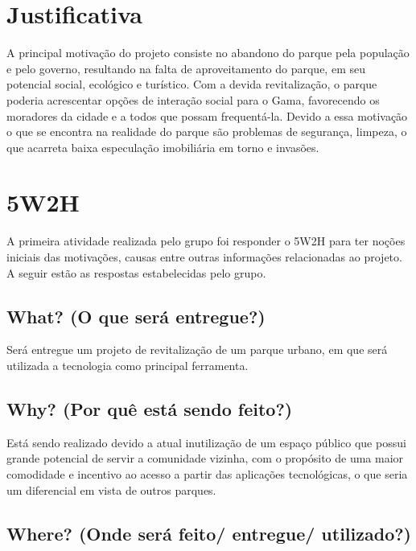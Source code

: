 \section{Justificativa}

A principal motiva\c{c}\~ao do projeto consiste no abandono do parque pela popula\c{c}\~ao e pelo governo, resultando na falta de aproveitamento do parque, em seu potencial social, ecológico e turístico. Com a devida revitaliza\c{c}\~ao, o parque poderia acrescentar op\c{c}\~oes de intera\c{c}\~ao social para o Gama, favorecendo os moradores da cidade e a todos que possam frequent\'a-la.
Devido a essa motiva\c{c}\~ao o que se encontra na realidade do parque s\~ao problemas de seguran\c{c}a, limpeza, o que acarreta baixa especula\c{c}\~ao imobili\'aria em torno e invas\~oes. 

\section{5W2H}

A primeira atividade realizada pelo grupo foi responder o 5W2H para ter no\c{c}\~oes iniciais das motiva\c{c}\~oes, causas entre outras informa\c{c}\~oes relacionadas ao projeto. A seguir est\~ao as respostas estabelecidas pelo grupo.

\subsection{What? (O que ser\'a entregue?)}

Ser\'a entregue um projeto de revitaliza\c{c}\~ao de um parque urbano, em que ser\'a utilizada a tecnologia como principal ferramenta.

\subsection{Why? (Por qu\^e est\'a sendo feito?)}

Est\'a sendo realizado devido a atual inutiliza\c{c}\~ao de um espa\c{c}o p\'ublico que possui grande potencial de servir a comunidade vizinha, com o prop\'osito de uma maior comodidade e incentivo ao acesso a partir das aplica\c{c}\~oes tecnol\'ogicas, o que seria um diferencial em vista de outros parques.

\subsection{Where? (Onde ser\'a feito/ entregue/ utilizado?)}

